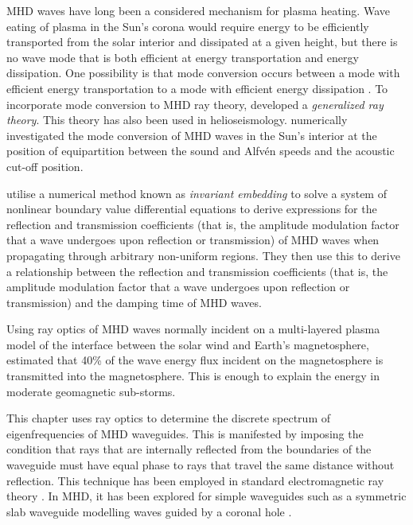 	MHD waves have long been a considered mechanism for plasma heating. Wave eating of plasma in the Sun's corona would require energy to be efficiently transported from the solar interior and dissipated at a given height, but there is no wave mode that is both efficient at energy transportation and energy dissipation. One possibility is that mode conversion occurs between a mode with efficient energy transportation to a mode with efficient energy dissipation \citep{par_etal12}. To incorporate mode conversion to MHD ray theory, \cite{shu_etal06} developed a \textit{generalized ray theory}. This theory has also been used in helioseismology. \cite{cal06} numerically investigated the mode conversion of MHD waves in the Sun's interior at the position of equipartition between the sound and Alfv\'{e}n speeds and the acoustic cut-off position.
	
	\cite{lee_etal02a} utilise a numerical method known as \textit{invariant embedding} to solve a system of nonlinear boundary value differential equations to derive expressions for the reflection and transmission coefficients (that is, the amplitude modulation factor that a wave undergoes upon reflection or transmission) of MHD waves when propagating through arbitrary non-uniform regions. They then use this to derive a relationship between the reflection and transmission coefficients (that is, the amplitude modulation factor that a wave undergoes upon reflection or transmission) and the damping time of MHD waves.
	
	Using ray optics of MHD waves normally incident on a multi-layered plasma model of the interface between the solar wind and Earth's magnetosphere, \cite{leo_etal03} estimated that 40\% of the wave energy flux incident on the magnetosphere is transmitted into the magnetosphere. This is enough to explain the energy in moderate geomagnetic sub-storms.
	
	This chapter uses ray optics to determine the discrete spectrum of eigenfrequencies of MHD waveguides. This is manifested by imposing the condition that rays that are internally reflected from the boundaries of the waveguide must have equal phase to rays that travel the same distance without reflection. This technique has been employed in standard electromagnetic ray theory \citep{bor_etal99}. In MHD, it has been explored for simple waveguides such as a symmetric slab waveguide modelling waves guided by a coronal hole \citep{dav_85}.
	
	
